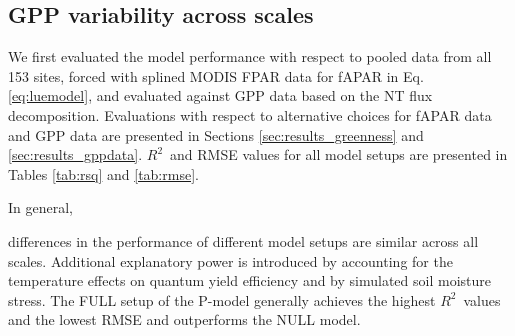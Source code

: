 \documentclass{myreport}
\newcommand{\rsq}{$R^2$}
\begin{document}
\subsection{GPP variability across scales}

We first evaluated the model performance with respect to pooled data from all 153 sites, forced with splined MODIS FPAR data for fAPAR in Eq. \ref{eq:luemodel}, and evaluated against GPP data based on the NT flux decomposition. Evaluations with respect to alternative choices for fAPAR data and GPP data are presented in Sections \ref{sec:results_greenness} and \ref{sec:results_gppdata}. \rsq\ and RMSE values for all model setups are presented in Tables \ref{tab:rsq} and \ref{tab:rmse}.

In general,


differences in the performance of different model setups are similar across all scales. Additional explanatory power is introduced by accounting for the temperature effects on quantum yield efficiency and by simulated soil moisture stress. The FULL setup of the P-model generally achieves the highest \rsq\ values and the lowest RMSE and outperforms the NULL model.


\end{document}
